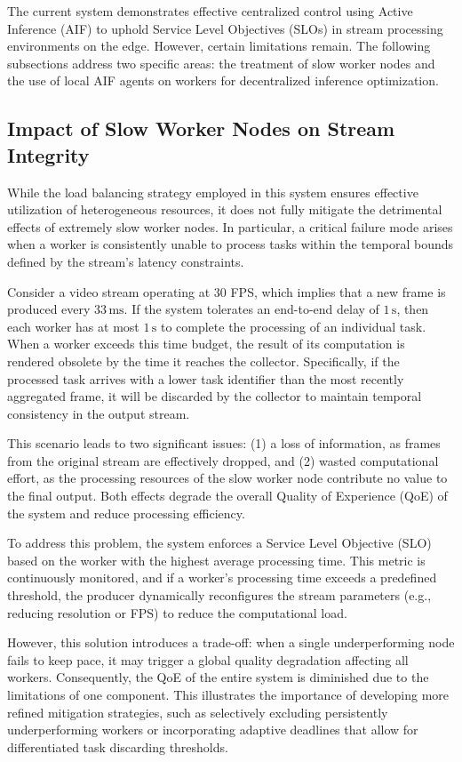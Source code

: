 The current system demonstrates effective centralized control using Active Inference (AIF) to uphold Service Level Objectives (SLOs) in stream processing environments on the edge. However, certain limitations remain. The following subsections address two specific areas: the treatment of slow worker nodes and the use of local AIF agents on workers for decentralized inference optimization.


\subsection{Impact of Slow Worker Nodes on Stream Integrity}

While the load balancing strategy employed in this system ensures effective utilization of heterogeneous resources, it does not fully mitigate the detrimental effects of extremely slow worker nodes. In particular, a critical failure mode arises when a worker is consistently unable to process tasks within the temporal bounds defined by the stream's latency constraints.

Consider a video stream operating at 30 FPS, which implies that a new frame is produced every \(33\,\text{ms}\). If the system tolerates an end-to-end delay of \(1\,\text{s}\), then each worker has at most \(1\,\text{s}\) to complete the processing of an individual task. When a worker exceeds this time budget, the result of its computation is rendered obsolete by the time it reaches the collector. Specifically, if the processed task arrives with a lower task identifier than the most recently aggregated frame, it will be discarded by the collector to maintain temporal consistency in the output stream.

This scenario leads to two significant issues: (1) a loss of information, as frames from the original stream are effectively dropped, and (2) wasted computational effort, as the processing resources of the slow worker node contribute no value to the final output. Both effects degrade the overall Quality of Experience (QoE) of the system and reduce processing efficiency.

To address this problem, the system enforces a Service Level Objective (SLO) based on the worker with the highest average processing time. This metric is continuously monitored, and if a worker's processing time exceeds a predefined threshold, the producer dynamically reconfigures the stream parameters (e.g., reducing resolution or FPS) to reduce the computational load. 

However, this solution introduces a trade-off: when a single underperforming node fails to keep pace, it may trigger a global quality degradation affecting all workers. Consequently, the QoE of the entire system is diminished due to the limitations of one component. This illustrates the importance of developing more refined mitigation strategies, such as selectively excluding persistently underperforming workers or incorporating adaptive deadlines that allow for differentiated task discarding thresholds.

